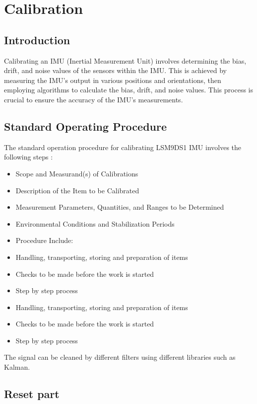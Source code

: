 \section{Calibration}
\subsection{Introduction}

Calibrating an IMU (Inertial Measurement Unit) involves determining the bias, drift, and noise values of the sensors within the IMU. This is achieved by measuring the IMU's output in various positions and orientations, then employing algorithms to calculate the bias, drift, and noise values. This process is crucial to ensure the accuracy of the IMU's measurements. \cite{sugunsegu_imu_calibration:2024}


\subsection{Standard Operating Procedure}

The standard operation procedure for calibrating LSM9DS1 IMU involves the following steps \cite{sugunsegu_imu_calibration:2024} :
\begin{itemize}
	\item Scope and Measurand(s) of Calibrations
	\item Description of the Item to be Calibrated
	\item Measurement Parameters, Quantities, and Ranges to be Determined
	\item Environmental Conditions and Stabilization Periods
	\item Procedure Include:
	\item Handling, transporting, storing and preparation of items
	\item Checks to be made before the work is started
	\item Step by step process
	\item Handling, transporting, storing and preparation of items
	\item Checks to be made before the work is started
	\item Step by step process
\end{itemize}


The signal can be cleaned by different filters using different libraries such as Kalman.


\subsection{Reset part}

